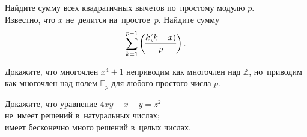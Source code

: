 \begin{problems}

\item
\subproblem
Найдите сумму всех квадратичных вычетов по~простому модулю $p$.
\\
\subproblem
Известно, что $x$ не~делится на~простое~$p$.
Найдите сумму
\[
    \sum_{k = 1}^{p-1}
        \legendre{k(k+x)}{p}
\, . \]

\item
Докажите, что многочлен $x^4 + 1$ неприводим как многочлен над $\mathbb{Z}$,
но~приводим как многочлен над полем $\mathbb{F}_p$ для любого
простого числа $p$.

\item
Докажите, что уравнение $4 x y - x - y = z^2$
\\
\subproblem не~имеет решений в~натуральных числах;
\\
\subproblem имеет бесконечно много решений в~целых числах.

\end{problems}

